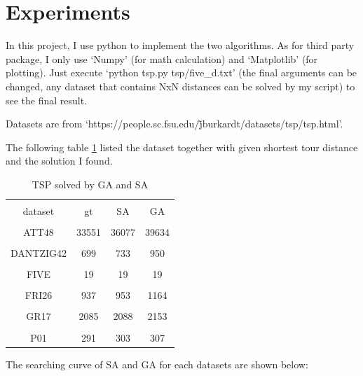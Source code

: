 \documentclass[a4paper,12pt]{article}
\begin{document}
\section{Experiments}

	In this project, I use python to implement the two algorithms. As for third party package, I only use `Numpy' (for math calculation) and `Matplotlib' (for plotting). Just execute `python tsp.py tsp/five\_d.txt' (the final arguments can be changed, any dataset that contains NxN distances can be solved by my script) to see the final result.

	Datasets are from `https://people.sc.fsu.edu/\~jburkardt/datasets/tsp/tsp.html'.

	The following table \ref{table1} listed the dataset together with given shortest tour distance and the solution I found.

	\begin{table}[htbp]
	\centering
	\caption{TSP solved by GA and SA}
	\label{table1}
	\begin{tabular}{|c|c|c|c|}
		\hline
		& & & \\[-3pt]
		dataset & gt        & SA        & GA \\\hline      & & & \\[-3pt]
		ATT48   & 33551 & 36077 & 39634 \\\hline & & & \\[-3pt]
DANTZIG42   & 699     & 733     & 950      \\\hline & & & \\[-3pt]
		FIVE      & 19        & 19        & 19        \\\hline & & & \\[-3pt]
		FRI26    & 937     & 953      & 1164    \\\hline & & & \\[-3pt]
		GR17     & 2085   & 2088   & 2153    \\\hline & & & \\[-3pt]
		P01        & 291     & 303      & 307    \\\hline
	\end{tabular}
	\end{table}

	The searching curve of SA and GA for each datasets are shown below:
	\newline
	\newline
\end{document}
